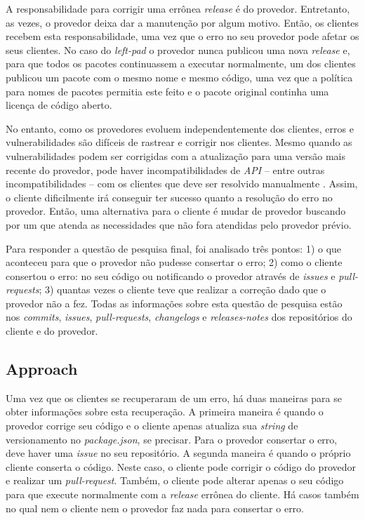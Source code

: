 A responsabilidade para corrigir uma errônea \textit{release} é do provedor. Entretanto, as vezes, o provedor deixa dar a manutenção por algum motivo. Então, os clientes recebem esta responsabilidade, uma vez que o erro no seu provedor pode afetar os seus clientes. No caso do \textit{left-pad} o provedor nunca publicou uma nova \textit{release} e, para que todos os pacotes continuassem a executar normalmente, um dos clientes publicou um pacote com o mesmo nome e mesmo código, uma vez que a política para nomes de pacotes permitia este feito e o pacote original continha uma licença de código aberto.

No entanto, como os provedores evoluem independentemente dos clientes, erros e vulnerabilidades são difíceis de rastrear e corrigir nos clientes. Mesmo quando as vulnerabilidades podem ser corrigidas com a atualização para uma versão mais recente do provedor, pode haver incompatibilidades de \textit{API} -- entre outras incompatibilidades -- com os clientes que deve ser resolvido manualmente \cite{Foo:2018:ESC:3236024.3275535}. Assim, o cliente dificilmente irá conseguir ter sucesso quanto a resolução do erro no provedor. Então, uma alternativa para o cliente é mudar de provedor buscando por um que atenda as necessidades que não fora atendidas pelo provedor prévio.

Para responder a questão de pesquisa final, foi analisado três pontos: 1) o que aconteceu para que o provedor não pudesse consertar o erro; 2) como o cliente consertou o erro: no seu código ou notificando o provedor através de \textit{issues} e \textit{pull-requests}; 3) quantas vezes o cliente teve que realizar a correção dado que o provedor não a fez. Todas as informações sobre esta questão de pesquisa estão nos \textit{commits}, \textit{issues}, \textit{pull-requests}, \textit{changelogs} e \textit{releases-notes} dos repositórios do cliente e do provedor.

\subsection{Approach}
\label{apr:rq3}

Uma vez que os clientes se recuperaram de um erro, há duas maneiras para se obter informações sobre esta recuperação. A primeira maneira é quando o provedor corrige seu código e o cliente apenas atualiza sua \textit{string} de versionamento no \textit{package.json}, se precisar. Para o provedor consertar o erro, deve haver uma \textit{issue} no seu repositório. A segunda maneira é quando o próprio cliente conserta o código. Neste caso, o cliente pode corrigir o código do provedor e realizar um \textit{pull-request}. Também, o cliente pode alterar apenas o seu código para que execute normalmente com a \textit{release} errônea do cliente. Há casos também no qual nem o cliente nem o provedor faz nada para consertar o erro.

